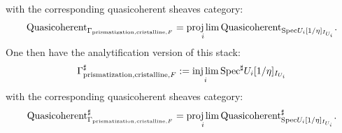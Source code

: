 \documentclass[12pt]{article}
\theoremstyle{definition}
\begin{document}
with the corresponding quasicoherent sheaves category:
\begin{align}
\mathrm{Quasicoherent}_{\mathrm{\Gamma}_{\mathrm{prismatization},\mathrm{cristalline},F}}=\projlim_i \mathrm{Quasicoherent}_{\mathrm{Spec}U_i[1/\eta]_{I_{U_i}}}.
\end{align}
One then have the analytification version of this stack:
\begin{align}
\mathrm{\Gamma}^\sharp_{\mathrm{prismatization},\mathrm{cristalline},F}:=\injlim_i \mathrm{Spec}^\sharp U_i[1/\eta]_{I_{U_i}}
\end{align}
with the corresponding quasicoherent sheaves category:
\begin{align}
\mathrm{Quasicoherent}^\sharp_{\mathrm{\Gamma}_{\mathrm{prismatization},\mathrm{cristalline},F}}=\projlim_i \mathrm{Quasicoherent}^\sharp_{\mathrm{Spec}U_i[1/\eta]_{I_{U_i}}}.
\end{align} 
\end{document}
